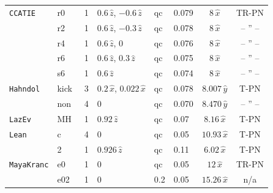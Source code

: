 \begin{table}
\begin{center}
\begin{tabular}{|l|l|l|l|l|l|c|c|}
{\tt CCATIE}
              & r0~\cite{Pollney:2007ss}    & 1 & $0.6\,\hat z$, $-0.6\,\hat z$  & qc &
              0.079 & $8\,\hat x$ & TR-PN \cite{Husa:2007rh} \\
\hfill\cite{Alcubierre:2000xu,Alcubierre:2002kk,Koppitz:2007ev,Pollney:2007ss}
	      & r2~\cite{Pollney:2007ss}     & 1 & $0.6\,\hat z$, $-0.3\,\hat z$    & qc  &
              0.078 & $8\,\hat x$ & -- '' -- \\ %
              & r4~\cite{Pollney:2007ss}     & 1 & $0.6\,\hat z$, $0$       & qc  &
              0.076 & $8\,\hat x$ & -- '' -- \\ %
              & r6~\cite{Pollney:2007ss}     & 1 & $0.6\,\hat z$, $0.3\,\hat z$    & qc  &
              0.075 & $8\,\hat x$ & -- '' -- \\%
              & s6~\cite{Rezzolla:2007xa}     & 1 & $0.6\,\hat z$     & qc  &
              0.074 & $8\,\hat x$ & -- '' -- \\[1em] %

{\tt Hahndol}      & kick   & 3 & $0.2\,\hat x$, $0.022\,\hat x$ & qc  &0.078 &  $8.007\,\hat{y}$ & T-PN \cite{Kidder:1995zr}\\ 
\hfill\cite{Imbiriba:2004tp,vanMeter:2006vi}            & non    & 4 & $0$     & qc
              &0.070 & $8.470\,\hat{y}$ & -- '' -- \\ %

{\tt LazEv}$\,$\cite{Zlochower:2005bj,Campanelli:2005dd}$\!$    & MH~\cite{Dain:2008ck} & 1 & $0.92\,\hat z$   & qc  &
0.07  & $8.16\,\hat x$ & T-PN \cite{Kidder:1995zr,Blanchet:1999pm} \\[1em]

{\tt Lean}\hfill\cite{Sperhake:2006cy}      &  c     & 4 & $0$       & qc  &
0.05  & $10.93\,\hat x$ & T-PN \cite{Brugmann:2008zz} \\ 
             &  2     & 1 & $0.926\,\hat z$   & qc  &
              0.11  & $6.02\,\hat x$ & T-PN \cite{Kidder:1995zr} \\[1em]

{\tt MayaKranc}     & e0  \cite{Hinder:2007qu}   & 1 & $0$       &  qc &
0.05 & $12\,\hat x$ & TR-PN \cite{Husa:2007rh} \\
  \hfill\cite{Vaishnav:2007nm}            & e02 \cite{Hinder:2007qu}   & 1 & $0$       & 0.2&
              0.05 & $15.26\,\hat x$ & n/a \\[1em]


\end{tabular}
\end{center}
\end{table}
